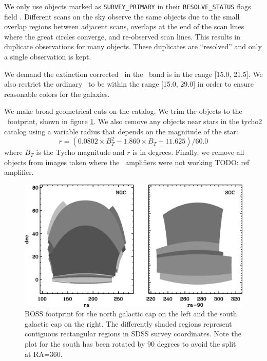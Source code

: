 \documentclass[preprint]{aastex}
\newcommand{\modelrmin}{15.0}
\newcommand{\modelrmax}{29.0}
\newcommand{\rmin}{15.0}
\newcommand{\rmax}{21.5}
\begin{document}
We only use objects marked as \texttt{SURVEY\_PRIMARY} in their
\texttt{RESOLVE\_STATUS} flags field \citep{dr7resolve}. Different scans on the
sky observe the same objects due to the small overlap regions between adjacent
scans, overlaps at the end of the scan lines where the great circles converge,
and re-observed scan lines.  This results in duplicate observations for many
objects.  These duplicates are ``resolved'' and only a single observation is
kept.

We demand the extinction corrected \citep{Schlegel98} \cmodelmag\ in the \rmag\
band is in the range [\rmin, \rmax].  We also restrict the ordinary \modelmag\
to be within the range [\modelrmin, \modelrmax] in order to ensure reasonable
colors for the galaxies.

We make broad geometrical cuts on the catalog.  We trim the objects to the
\boss\ footprint, shown in figure \ref{fig:footprint}. We also remove any
objects near stars in the tycho2 catalog \citep{tycho2} using a variable radius
that depends on the magnitude of the star:
\begin{equation}
r = (0.0802\times B_T^2 - 1.860\times B_T + 11.625)/60.0
\end{equation}
where $B_T$ is the Tycho magnitude and $r$ is in degrees.  Finally, we remove
all objects from images taken where the \umag\ amplifiers were not working
TODO: ref amplifier.

\begin{figure}[t] \centering
 \centering 
 \includegraphics[scale=0.5]{figures/ngc-sgc-poly.eps}
 \caption{BOSS footprint for the north galactic cap on the left
 and the south galactic cap on the right.  The differently shaded
 regions represent contiguous rectangular regions in SDSS survey coordinates.
 Note the plot for the south has been rotated by 90 degrees to avoid
 the split at RA=360.}
 \label{fig:footprint}
\end{figure}
\end{document}
